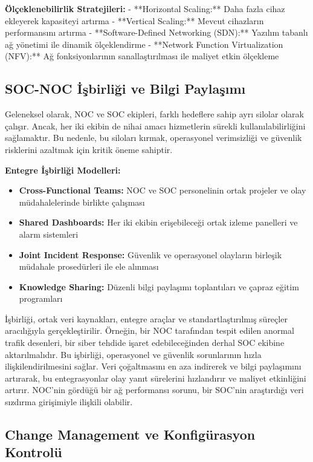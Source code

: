 \textbf{Ölçeklenebilirlik Stratejileri:}
- **Horizontal Scaling:** Daha fazla cihaz ekleyerek kapasiteyi artırma
- **Vertical Scaling:** Mevcut cihazların performansını artırma
- **Software-Defined Networking (SDN):** Yazılım tabanlı ağ yönetimi ile dinamik ölçeklendirme
- **Network Function Virtualization (NFV):** Ağ fonksiyonlarının sanallaştırılması ile maliyet etkin ölçekleme

\subsection{SOC-NOC İşbirliği ve Bilgi Paylaşımı}

Geleneksel olarak, NOC ve SOC ekipleri, farklı hedeflere sahip ayrı silolar olarak çalışır. Ancak, her iki ekibin de nihai amacı hizmetlerin sürekli kullanılabilirliğini sağlamaktır. Bu nedenle, bu siloları kırmak, operasyonel verimsizliği ve güvenlik risklerini azaltmak için kritik öneme sahiptir.

\textbf{Entegre İşbirliği Modelleri:}
\begin{itemize}
    \item \textbf{Cross-Functional Teams:} NOC ve SOC personelinin ortak projeler ve olay müdahalelerinde birlikte çalışması
    \item \textbf{Shared Dashboards:} Her iki ekibin erişebileceği ortak izleme panelleri ve alarm sistemleri
    \item \textbf{Joint Incident Response:} Güvenlik ve operasyonel olayların birleşik müdahale prosedürleri ile ele alınması
    \item \textbf{Knowledge Sharing:} Düzenli bilgi paylaşımı toplantıları ve çapraz eğitim programları
\end{itemize}

İşbirliği, ortak veri kaynakları, entegre araçlar ve standartlaştırılmış süreçler aracılığıyla gerçekleştirilir. Örneğin, bir NOC tarafından tespit edilen anormal trafik desenleri, bir siber tehdide işaret edebileceğinden derhal SOC ekibine aktarılmalıdır. Bu işbirliği, operasyonel ve güvenlik sorunlarının hızla ilişkilendirilmesini sağlar. Veri çoğaltmasını en aza indirerek ve bilgi paylaşımını artırarak, bu entegrasyonlar olay yanıt sürelerini hızlandırır ve maliyet etkinliğini artırır. NOC'nin gördüğü bir ağ performansı sorunu, bir SOC'nin araştırdığı veri sızdırma girişimiyle ilişkili olabilir.

\subsection{Change Management ve Konfigürasyon Kontrolü}

